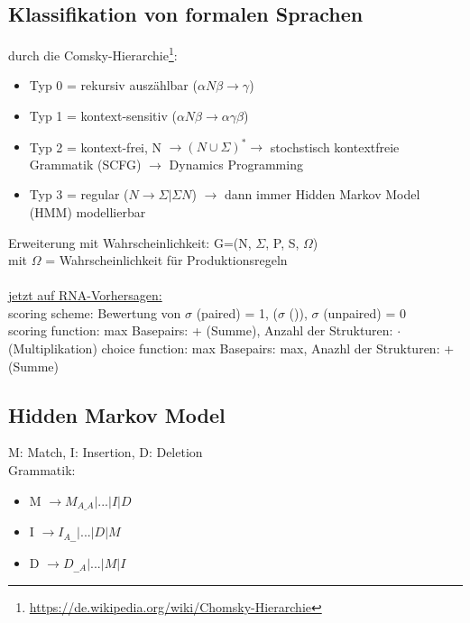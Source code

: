 \documentclass[12pt]{article}
\begin{document}
\subsection{Klassifikation von formalen Sprachen}
durch die Comsky-Hierarchie\footnote{\url{https://de.wikipedia.org/wiki/Chomsky-Hierarchie}}:
\begin{itemize}
	\item Typ 0 = rekursiv auszählbar ($\alpha N \beta \to \gamma$)
	\item Typ 1 = kontext-sensitiv ($\alpha N \beta \to \alpha \gamma \beta$)
	\item Typ 2 = kontext-frei, N $\to (N \cup \Sigma)^* \to$ stochstisch kontextfreie Grammatik (SCFG) $\to$ Dynamics Programming
	\item Typ 3 = regular ($N \to \Sigma | \Sigma N$) $\to$ dann immer Hidden Markov Model (HMM) modellierbar
\end{itemize}


Erweiterung mit Wahrscheinlichkeit:
G=(N, $\Sigma$, P, S, $\Omega$)\\
mit $\Omega$ = Wahrscheinlichkeit für Produktionsregeln\\
\\

\underline{jetzt auf RNA-Vorhersagen:}\\

scoring scheme: Bewertung von $\sigma$ (paired) = 1, ($\sigma$ ()), $\sigma$ (unpaired) = 0\\
scoring function: max Basepairs: + (Summe), Anzahl der Strukturen: $\cdot$ (Multiplikation)
choice function: max Basepairs: max, Anazhl der Strukturen: + (Summe)


\subsection{Hidden Markov Model}


M: Match, I: Insertion, D: Deletion\\

Grammatik:
\begin{itemize}
	\item M $\to M_{A\_A} | ... | I | D$
	\item I $\to I_{A\_\_} | ... | D | M$
	\item D $\to D_{\_\_A} | ... | M | I$
\end{itemize}
\end{document}
